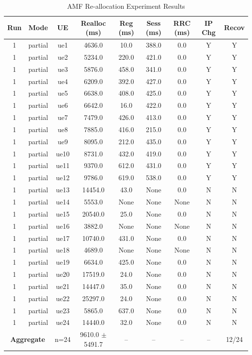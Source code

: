 \begin{table}[ht]
\centering
\begin{tabular}{|c|c|c|c|c|c|c|c|c|}
\hline
Run & Mode & UE & Realloc (ms) & Reg (ms) & Sess (ms) & RRC (ms) & IP Chg & Recov \\
\hline
1 & partial & ue1 & 4636.0 & 10.0 & 388.0 & 0.0 & Y & Y \\
1 & partial & ue2 & 5234.0 & 220.0 & 421.0 & 0.0 & Y & Y \\
1 & partial & ue3 & 5876.0 & 458.0 & 341.0 & 0.0 & Y & Y \\
1 & partial & ue4 & 6209.0 & 392.0 & 427.0 & 0.0 & Y & Y \\
1 & partial & ue5 & 6638.0 & 408.0 & 425.0 & 0.0 & Y & Y \\
1 & partial & ue6 & 6642.0 & 16.0 & 422.0 & 0.0 & Y & Y \\
1 & partial & ue7 & 7479.0 & 426.0 & 413.0 & 0.0 & Y & Y \\
1 & partial & ue8 & 7885.0 & 416.0 & 215.0 & 0.0 & Y & Y \\
1 & partial & ue9 & 8095.0 & 212.0 & 435.0 & 0.0 & Y & Y \\
1 & partial & ue10 & 8731.0 & 432.0 & 419.0 & 0.0 & Y & Y \\
1 & partial & ue11 & 9370.0 & 612.0 & 431.0 & 0.0 & Y & Y \\
1 & partial & ue12 & 9786.0 & 619.0 & 538.0 & 0.0 & Y & Y \\
1 & partial & ue13 & 14454.0 & 43.0 & None & 0.0 & N & N \\
1 & partial & ue14 & 5553.0 & None & None & None & N & N \\
1 & partial & ue15 & 20540.0 & 25.0 & None & 0.0 & N & N \\
1 & partial & ue16 & 3882.0 & None & None & None & N & N \\
1 & partial & ue17 & 10740.0 & 431.0 & None & 0.0 & N & N \\
1 & partial & ue18 & 4689.0 & None & None & None & N & N \\
1 & partial & ue19 & 6634.0 & 425.0 & None & 0.0 & N & N \\
1 & partial & ue20 & 17519.0 & 24.0 & None & 0.0 & N & N \\
1 & partial & ue21 & 14447.0 & 35.0 & None & 0.0 & N & N \\
1 & partial & ue22 & 25297.0 & 24.0 & None & 0.0 & N & N \\
1 & partial & ue23 & 5865.0 & 637.0 & None & 0.0 & N & N \\
1 & partial & ue24 & 14440.0 & 32.0 & None & 0.0 & N & N \\
\multicolumn{2}{|c|}{\textbf{Aggregate}} & n=24 & 9610.0 $\pm$ 5491.7 & -- & -- & -- & -- & 12/24 \\
\hline
\end{tabular}
\caption{AMF Re-allocation Experiment Results}
\label{tab:amf_realloc}
\end{table}
